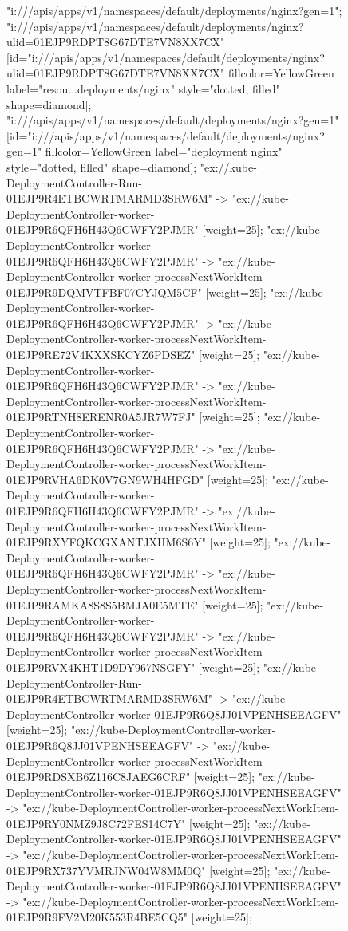 \begin{figure}[p]
\begin{sideways}
{{"i:///apis/apps/v1/namespaces/default/deployments/nginx?gen=1";
}
"i:///apis/apps/v1/namespaces/default/deployments/nginx?ulid=01EJP9RDPT8G67DTE7VN8XX7CX" [id="i:///apis/apps/v1/namespaces/default/deployments/nginx?ulid=01EJP9RDPT8G67DTE7VN8XX7CX" fillcolor=YellowGreen label="resou...deployments/nginx" style="dotted, filled" shape=diamond];
"i:///apis/apps/v1/namespaces/default/deployments/nginx?gen=1" [id="i:///apis/apps/v1/namespaces/default/deployments/nginx?gen=1" fillcolor=YellowGreen label="deployment nginx" style="dotted, filled" shape=diamond];
"ex://kube-DeploymentController-Run-01EJP9R4ETBCWRTMARMD3SRW6M" -> "ex://kube-DeploymentController-worker-01EJP9R6QFH6H43Q6CWFY2PJMR" [weight=25];
"ex://kube-DeploymentController-worker-01EJP9R6QFH6H43Q6CWFY2PJMR" -> "ex://kube-DeploymentController-worker-processNextWorkItem-01EJP9R9DQMVTFBF07CYJQM5CF" [weight=25];
"ex://kube-DeploymentController-worker-01EJP9R6QFH6H43Q6CWFY2PJMR" -> "ex://kube-DeploymentController-worker-processNextWorkItem-01EJP9RE72V4KXXSKCYZ6PDSEZ" [weight=25];
"ex://kube-DeploymentController-worker-01EJP9R6QFH6H43Q6CWFY2PJMR" -> "ex://kube-DeploymentController-worker-processNextWorkItem-01EJP9RTNH8ERENR0A5JR7W7FJ" [weight=25];
"ex://kube-DeploymentController-worker-01EJP9R6QFH6H43Q6CWFY2PJMR" -> "ex://kube-DeploymentController-worker-processNextWorkItem-01EJP9RVHA6DK0V7GN9WH4HFGD" [weight=25];
"ex://kube-DeploymentController-worker-01EJP9R6QFH6H43Q6CWFY2PJMR" -> "ex://kube-DeploymentController-worker-processNextWorkItem-01EJP9RXYFQKCGXANTJXHM6S6Y" [weight=25];
"ex://kube-DeploymentController-worker-01EJP9R6QFH6H43Q6CWFY2PJMR" -> "ex://kube-DeploymentController-worker-processNextWorkItem-01EJP9RAMKA8S8S5BMJA0E5MTE" [weight=25];
"ex://kube-DeploymentController-worker-01EJP9R6QFH6H43Q6CWFY2PJMR" -> "ex://kube-DeploymentController-worker-processNextWorkItem-01EJP9RVX4KHT1D9DY967NSGFY" [weight=25];
"ex://kube-DeploymentController-Run-01EJP9R4ETBCWRTMARMD3SRW6M" -> "ex://kube-DeploymentController-worker-01EJP9R6Q8JJ01VPENHSEEAGFV" [weight=25];
"ex://kube-DeploymentController-worker-01EJP9R6Q8JJ01VPENHSEEAGFV" -> "ex://kube-DeploymentController-worker-processNextWorkItem-01EJP9RDSXB6Z116C8JAEG6CRF" [weight=25];
"ex://kube-DeploymentController-worker-01EJP9R6Q8JJ01VPENHSEEAGFV" -> "ex://kube-DeploymentController-worker-processNextWorkItem-01EJP9RY0NMZ9J8C72FES14C7Y" [weight=25];
"ex://kube-DeploymentController-worker-01EJP9R6Q8JJ01VPENHSEEAGFV" -> "ex://kube-DeploymentController-worker-processNextWorkItem-01EJP9RX737YVMRJNW04W8MM0Q" [weight=25];
"ex://kube-DeploymentController-worker-01EJP9R6Q8JJ01VPENHSEEAGFV" -> "ex://kube-DeploymentController-worker-processNextWorkItem-01EJP9R9FV2M20K553R4BE5CQ5" [weight=25];
}
\end{sideways}
\end{figure}
